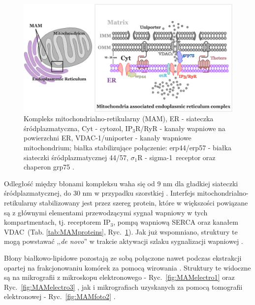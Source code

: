 \begin{figure}[!ht]
  \centering
  \includegraphics[width=1\textwidth]{rysunki/rozdzial_1/MAM}
  \caption[MAM - kompleks mitochondrialno-retikularny, schemat]{Kompleks mitochondrialno-retikularny (MAM), ER - siateczka śródplazmatyczna, Cyt - cytozol, IP$_3$R/RyR - kanały wapniowe na powierzchni ER, \mbox {VDAC-1/uniporter} - kanały wapniowe mitochondrium; białka stabilizujące połączenie: erp44/erp57 - białka siateczki śródplazmatycznej 44/57, $\sigma_1$R - \mbox {sigma-1 receptor} oraz chaperon grp75 \cite{Dyzma2012,Szopa2013}.}
  \label{fig:MAMschemat}
\end{figure}


Odległość między błonami kompleksu waha się od 9 nm dla gładkiej siateczki śródplazmatycznej, do 30 nm w przypadku szorstkiej \cite{Csordas2006}. Interfejs mitochondrialno-retikularny stabilizowany jest przez szereg protein, które w większości powiązane są z głównymi elementami przewodzącymi sygnał wapniowy w tych kompartmentach, tj. receptorem IP$_3$, pompą wapniową SERCA oraz kanałem VDAC~(Tab. \ref{tab:MAMproteins}, Ryc.~\ref{fig:MAMschemat}). Jak już wspomniano, struktury te mogą powstawać ,,\textit{de novo}'' w trakcie aktywacji szlaku sygnalizacji wapniowej \cite{Csordas2010}.


Błony białkowo-lipidowe pozostają ze sobą połączone nawet podczas ekstrakcji opartej na frakcjonowaniu komórek za pomocą wirowania \cite{Wieckowski2009}. Struktury te widoczne są na mikrografii z mikroskopu elektronowego - Ryc.~\ref{fig:MAMelectro1} \cite{Pereda1992} oraz Ryc.~\ref{fig:MAMelectro3} \cite{Lebiedzinska2009,Scheffler1999}, jak i mikrografiach uzyskanych za pomocą tomografii elektronowej - Ryc.~\ref{fig:MAMfoto2} \cite{Rowland2012}.

